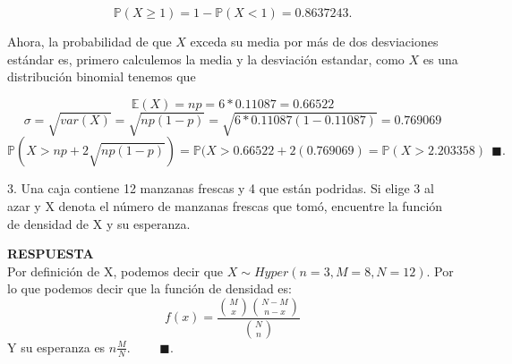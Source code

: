 \documentclass[11pt,letterpaper]{article}
\newcommand{\mP}{\mathbb{P}}
\newcommand{\mE}{\mathbb{E}}
\newcommand{\res}{\textbf{RESPUESTA}\\}
\newcommand{\fin}{$\blacksquare.$}
\newcommand{\finf}{\blacksquare.}
\begin{document}
\begin{itemize}
$$\mP(X\geq1)=1-\mP(X<1)=0.8637243.$$

Ahora, la probabilidad de que $X$ exceda su media por más de dos desviaciones estándar es, primero calculemos la media y la desviación estandar, como $X$ es una distribución binomial tenemos que 

$$\mE(X)=np=6*0.11087=0.66522$$
$$\sigma=\sqrt{var(X)} =\sqrt{np(1-p)}=\sqrt{6*0.11087(1-0.11087)}=0.769069$$
$$\mP(X>np+2\sqrt{np(1-p)})=\mP(X>0.66522+2(0.769069)=\mP(X> 2.203358) \ \ \finf$$

3. Una caja contiene 12 manzanas frescas y 4 que están podridas. Si elige 3 al azar y X denota el
número de manzanas frescas que tomó, encuentre la función de densidad de X y su esperanza.

\res 
Por definición de X, podemos decir que $X\sim Hyper(n=3, M=8, N=12)$. Por lo que podemos decir que la función de densidad es:
\begin{equation*}
f(x)= \frac{{M\choose x}{N-M\choose n-x}}{{N\choose n}}
\end{equation*}
Y su esperanza es $n\frac{M}{N}.$ \ \ \ \ \fin
\end{itemize}
\end{document}
